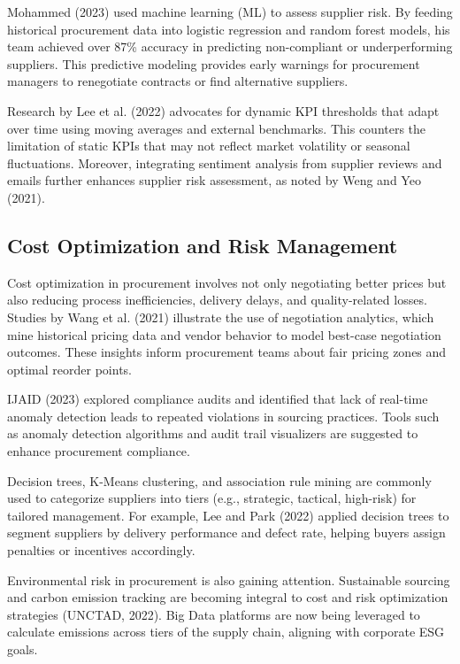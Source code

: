 \documentclass[10pt, twocolumn]{article}
\begin{document}
Mohammed (2023) used machine learning (ML) to assess supplier risk. By feeding historical procurement data into logistic regression and random forest models, his team achieved over 87\% accuracy in predicting non-compliant or underperforming suppliers. This predictive modeling provides early warnings for procurement managers to renegotiate contracts or find alternative suppliers.

Research by Lee et al. (2022) advocates for dynamic KPI thresholds that adapt over time using moving averages and external benchmarks. This counters the limitation of static KPIs that may not reflect market volatility or seasonal fluctuations. Moreover, integrating sentiment analysis from supplier reviews and emails further enhances supplier risk assessment, as noted by Weng and Yeo (2021).


\subsection{Cost Optimization and Risk Management}
Cost optimization in procurement involves not only negotiating better prices but also reducing process inefficiencies, delivery delays, and quality-related losses. Studies by Wang et al. (2021) illustrate the use of negotiation analytics, which mine historical pricing data and vendor behavior to model best-case negotiation outcomes. These insights inform procurement teams about fair pricing zones and optimal reorder points.

IJAID (2023) explored compliance audits and identified that lack of real-time anomaly detection leads to repeated violations in sourcing practices. Tools such as anomaly detection algorithms and audit trail visualizers are suggested to enhance procurement compliance.

Decision trees, K-Means clustering, and association rule mining are commonly used to categorize suppliers into tiers (e.g., strategic, tactical, high-risk) for tailored management. For example, Lee and Park (2022) applied decision trees to segment suppliers by delivery performance and defect rate, helping buyers assign penalties or incentives accordingly.

Environmental risk in procurement is also gaining attention. Sustainable sourcing and carbon emission tracking are becoming integral to cost and risk optimization strategies (UNCTAD, 2022). Big Data platforms are now being leveraged to calculate emissions across tiers of the supply chain, aligning with corporate ESG goals.
\end{document}
